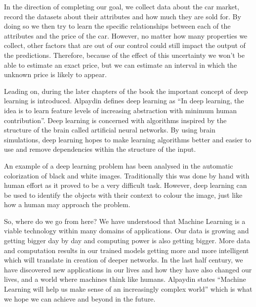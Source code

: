 \documentclass[11pt]{article} %
\begin{document}
In the direction of completing our goal, we collect data about the car market, record the datasets about their attributes and how much they are sold for. By doing so we then try to learn the specific relationships between each of the attributes and the price of the car. However, no matter how many properties we collect, other factors that are out of our control could still impact the output of the predictions. Therefore, because of the effect of this uncertainty we won’t be able to estimate an exact price, but we can estimate an interval in which the unknown price is likely to appear.
\par

Leading on, during the later chapters of the book the important concept of deep learning is introduced. Alpaydin defines deep learning as “In deep learning, the idea is to learn feature levels of increasing abstraction with minimum human contribution”. Deep learning is concerned with algorithms inspired by the structure of the brain called artificial neural networks. By using brain simulations, deep learning hopes to make learning algorithms better and easier to use and remove dependencies within the structure of the input.
\par

An example of a deep learning problem has been analysed in the automatic colorization of black and white images. Traditionally this was done by hand with human effort as it proved to be a very difficult task. However, deep learning can be used to identify the objects with their context to colour the image, just like how a human may approach the problem.
\par

So, where do we go from here? We have understood that Machine Learning is a viable technology within many domains of applications. Our data is growing and getting bigger day by day and computing power is also getting bigger. More data and computation results in our trained models getting more and more intelligent which will translate in creation of deeper networks. In the last half century, we have discovered new applications in our lives and how they have also changed our lives, and a world where machines think like humans. Alpaydin states “Machine Learning will help us make sense of an increasingly complex world” which is what we hope we can achieve and beyond in the future.
\end{document}
